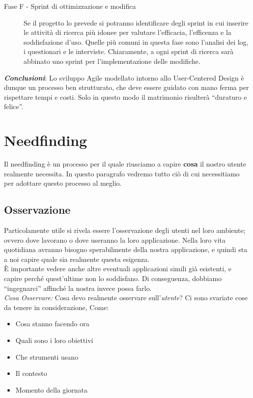 \documentclass[oneside]{book}
\begin{document}
\begin{description}
			\item[Fase F - Sprint di ottimizzazione e modifica] 
			Se il progetto lo prevede si potranno identificare degli sprint in cui inserire le attività di ricerca più idonee per valutare l’efficacia, l’efficenza e la soddisfazione d’uso. Quelle più comuni in questa fase sono l’analisi dei log, i questionari e le interviste. Chiaramente, a ogni sprint di ricerca sarà abbinato uno sprint per l’implementazione delle modifiche. 

			\end{description}
			\textbf{\emph{Conclusioni}}: Lo sviluppo Agile modellato intorno allo User-Centered Design è dunque un processo ben strutturato, che deve essere guidato con mano ferma per rispettare tempi e costi. Solo in questo modo il matrimonio risulterà ``duraturo e felice''. 

	\section{Needfinding} \label{sec:Needfinding}
		Il needfinding è un processo per il quale riusciamo a capire \textbf{cosa} il nostro utente realmente necessita. In questo paragrafo vedremo tutto ciò di cui necessitiamo per adottare questo processo al meglio.

		\subsection{Osservazione}
			Particolamente utile si rivela essere l'osservazione degli utenti nel loro ambiente; ovvero dove lavorano o dove useranno la loro applicazione. Nella loro vita quotidiana avranno bisogno sperabilmente della nostra applicazione, e quindi sta a noi capire quale sia realmente questa esigenza. \\

			È importante vedere anche altre eventuali applicazioni simili già esistenti, e capire perché quest'ultime non lo soddisfano. Di conseguenza, dobbiamo ``ingegnarci'' affinché la nostra invece possa farlo. \\

			\emph{Cosa Osservare:} Cosa devo realmente osservare sull'\emph{utente}? Ci sono svariate cose da tenere in considerazione, Come:
			\begin{itemize}
			\item Cosa stanno facendo ora
			\item Quali sono i loro obiettivi
			\item Che strumenti usano
			\item Il contesto
			\item Momento della giornata
			\end{itemize}
\end{document}
